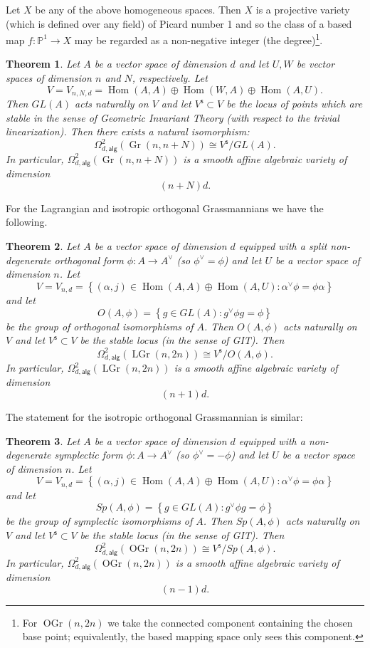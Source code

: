 \message{ !name(Bryan-Vakil.tex)}\documentclass{amsart}
\newtheorem{theorem}{Theorem}[section]
\theoremstyle{definition}
\newcommand{\PP}{\mathbb{P}}
\newcommand{\Hom}{\operatorname{Hom}}
\newcommand{\alg}{\mathsf{alg}}
\newcommand{\stable}{\mathsf{s}}
\newcommand{\Gr}{\operatorname{Gr}}
\newcommand{\LGr}{\operatorname{LGr}}
\newcommand{\OGr}{\operatorname{OGr}}
\newcommand{\LoopTwo}{\Omega^{2}_{d,\alg}}
\begin{document}
Let $X$ be any of the above homogeneous spaces. Then $X$
is a projective variety (which is defined over any field) of
Picard number 1 and so the class of a based map $f:\PP^{1}\to X$ may
be regarded as a non-negative integer (the degree)\footnote{For $\OGr
(n,2n)$ we take the connected component containing the chosen base
point; equivalently, the based mapping space only sees this component.}.



\begin{theorem}\label{thm: quiver description of Loop2alg(Gr(n,n+N))}
Let $A$ be a vector space of dimension $d$ and let $U,W$ be vector
spaces of dimension $n$ and $N$, respectively. Let
\[
V=V_{n,N,d} =\Hom (A,A)\oplus \Hom (W,A)\oplus \Hom (A,U).
\]
Then $GL(A)$ acts naturally on $V$ and let $V^{\stable}\subset V$ be
the locus of points which are stable in the sense of Geometric
Invariant Theory (with respect to the trivial linearization). Then
there exists a natural isomorphism:
\[
\LoopTwo (\Gr (n,n+N))\cong V^{\stable}/GL(A).
\]
In particular, $\LoopTwo (\Gr (n,n+N))$ is a smooth affine algebraic
variety of dimension 
\[
(n+N)d.
\]
\end{theorem}

For the Lagrangian and isotropic orthogonal Grassmannians we have the following.

\begin{theorem}\label{thm: quiver description of Loop2Alg(LGr)}
Let $A$ be a vector space of dimension $d$ equipped with a split
non-degenerate orthogonal form $\phi :A\to A^{\vee}$ (so
$\phi^{\vee}=\phi$) and let $U$ be a vector space of dimension
$n$. Let
\[
V=V_{n,d}=\left\{(\alpha ,j)\in \Hom (A,A)\oplus \Hom (A,U):
\alpha^{\vee}\phi =\phi \alpha \right\} 
\]
and let 
\[
O(A,\phi ) = \left\{g\in GL(A):g^{\vee}\phi g=\phi  \right\}
\]
be the group of orthogonal isomorphisms of $A$. Then $O(A,\phi )$ acts
naturally on $V$ and let $V^{\stable}\subset V$ be the stable
locus (in the sense of GIT). Then
\[
\LoopTwo (\LGr(n,2n))\cong V^{\stable}/O(A,\phi ). 
\]
In particular, $\LoopTwo (\LGr (n,2n))$ is a smooth affine algebraic
variety of dimension 
\[
(n+1)d.
\]
\end{theorem}

The statement for the isotropic orthogonal Grassmannian is similar:


\begin{theorem}\label{thm: quiver description of Loop2Alg(OGr)}
Let $A$ be a vector space of dimension $d$ equipped with a
non-degenerate symplectic form $\phi :A\to A^{\vee}$ (so
$\phi^{\vee}=-\phi$) and let $U$ be a vector space of dimension
$n$. Let
\[
V=V_{n,d}=\left\{(\alpha ,j)\in \Hom (A,A)\oplus \Hom (A,U):
\alpha^{\vee}\phi =\phi \alpha \right\} 
\]
and let 
\[
Sp(A,\phi ) = \left\{g\in GL(A):g^{\vee}\phi g=\phi  \right\}
\]
be the group of symplectic isomorphisms of $A$. Then $Sp(A,\phi )$ acts
naturally on $V$ and let $V^{\stable}\subset V$ be the stable
locus (in the sense of GIT). Then
\[
\LoopTwo (\OGr(n,2n))\cong V^{\stable}/Sp(A,\phi ). 
\]
In particular, $\LoopTwo (\OGr (n,2n))$ is a smooth affine algebraic
variety of dimension 
\[
(n-1)d.
\]
\end{theorem}
\end{document}

